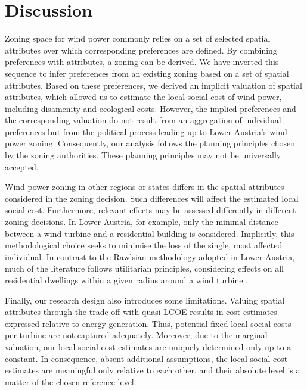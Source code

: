 \documentclass[review, a4paper, 12pt, authoryear, times]{elsarticle}
\begin{document}
\section{Discussion}\label{sec:discussion}
Zoning space for wind power commonly relies on a set of selected spatial attributes over which corresponding preferences are defined.
By combining preferences with attributes, a zoning can be derived.
We have inverted this sequence to infer preferences from an existing zoning based on a set of spatial attributes.
Based on these preferences, we derived an implicit valuation of spatial attributes, which allowed us to estimate the local social cost of wind power, including disamenity and ecological costs.
However, the implied preferences and the corresponding valuation do not result from an aggregation of individual preferences but from the political process leading up to Lower Austria's wind power zoning.
Consequently, our analysis follows the planning principles chosen by the zoning authorities.
These planning principles may not be universally accepted.

Wind power zoning in other regions or states differs in the spatial attributes considered in the zoning decision. Such differences will affect the estimated local social cost.
Furthermore, relevant effects may be assessed differently in different zoning decisions. In Lower Austria, for example, only the minimal distance between a wind turbine and a residential building is considered. Implicitly, this methodological choice seeks to minimise the loss of the single, most affected individual.
In contrast to the Rawlsian methodology adopted in Lower Austria, much of the literature follows utilitarian principles, considering effects on all residential dwellings within a given radius around a wind turbine \citep{Ruhnau2022, Lehmann2023, Grimsrud2023}.

Finally, our research design also introduces some limitations.
Valuing spatial attributes through the trade-off with quasi-LCOE results in cost estimates expressed relative to energy generation. 
Thus, potential fixed local social costs per turbine are not captured adequately.
Moreover, due to the marginal valuation, our local social cost estimates are uniquely determined only up to a constant.
In consequence, absent additional assumptions, the local social cost estimates are meaningful only relative to each other, and their absolute level is a matter of the chosen reference level.
\end{document}
